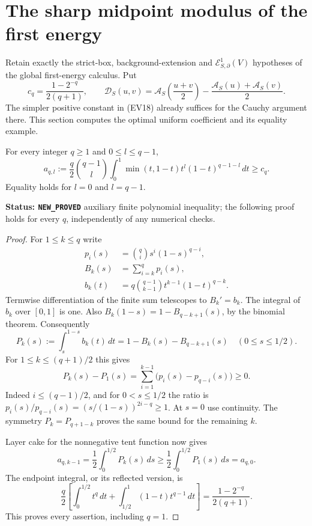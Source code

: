 \section{The sharp midpoint modulus of the first energy}
\label{sec:r11-sharp-midpoint-modulus}

Retain exactly the strict-box, background-extension and
$\mathcal E^1_{S,\partial}(V)$ hypotheses of the global
first-energy calculus.  Put
\[
 c_q=\frac{1-2^{-q}}{2(q+1)},\qquad
 \mathscr D_S(u,v)=
       \mathscr A_S\left(\frac{u+v}{2}\right)
            -\frac{\mathscr A_S(u)+\mathscr A_S(v)}2 .
 \tag{SM1}
\]
The simpler positive constant in (EV18) already suffices
for the Cauchy argument there.  This section computes
the optimal uniform coefficient and its equality example.

\begin{lemma}
\label{lem:r11-midpoint-Bernstein}
For every integer $q\geq1$ and $0\leq l\leq q-1$,
\[
 a_{q,l}:=
 \frac q2\binom{q-1}{l}
    \int_0^1\min(t,1-t)t^l(1-t)^{q-1-l}\,dt
       \geq c_q.
 \tag{SM2}
\]
Equality holds for $l=0$ and $l=q-1$.
\end{lemma}

\noindent\textbf{Status: \texttt{NEW\_PROVED}}
auxiliary finite polynomial inequality; the following
proof holds for every $q$, independently of any numerical
checks.

\begin{proof}
For $1\leq k\leq q$ write
\[
\begin{split}
 p_i(s)&=\binom qi s^i(1-s)^{q-i},\\
 B_k(s)&=\sum_{i=k}^q p_i(s),\\
 b_k(t)&=q\binom{q-1}{k-1}t^{k-1}(1-t)^{q-k}.
\end{split}
 \tag{SM3}
\]
Termwise differentiation of the finite sum telescopes
to $B_k'=b_k$.  The integral of $b_k$ over $[0,1]$
is one.  Also
$B_k(1-s)=1-B_{q-k+1}(s)$, by the binomial theorem.
Consequently
\[
 P_k(s):=\int_s^{1-s}b_k(t)\,dt
              =1-B_k(s)-B_{q-k+1}(s)
                    \quad(0\leq s\leq1/2).
 \tag{SM4}
\]
For $1\leq k\leq(q+1)/2$ this gives
\[
 P_k(s)-P_1(s)
       =\sum_{i=1}^{k-1}\bigl(p_i(s)-p_{q-i}(s)\bigr)\geq0.
 \tag{SM5}
\]
Indeed $i\leq(q-1)/2$, and for $0<s\leq1/2$
the ratio is
$p_i(s)/p_{q-i}(s)=(s/(1-s))^{2i-q}\geq1$.
At $s=0$ use continuity.
The symmetry $P_k=P_{q+1-k}$ proves the same
bound for the remaining $k$.

Layer cake for the nonnegative tent function now gives
\[
 a_{q,k-1}
   =\frac12\int_0^{1/2}P_k(s)\,ds
   \geq\frac12\int_0^{1/2}P_1(s)\,ds=a_{q,0}.
 \tag{SM6}
\]
The endpoint integral, or its reflected version, is
\[
 \frac q2\left[
      \int_0^{1/2}t^q\,dt
        +\int_{1/2}^1(1-t)t^{q-1}\,dt\right]
       =\frac{1-2^{-q}}{2(q+1)}.
 \tag{SM7}
\]
This proves every assertion, including $q=1$.
\end{proof}

